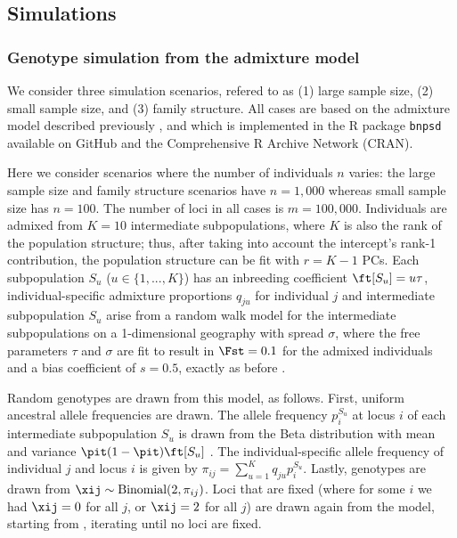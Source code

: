 \documentclass[11pt]{article}
\begin{document}
\subsection{Simulations}

\subsubsection{Genotype simulation from the admixture model}

We consider three simulation scenarios, refered to as (1) large sample size, (2) small sample size, and (3) family structure.
All cases are based on the admixture model described previously \citep{ochoa_fst1, ochoa_fst2}, and which is implemented in the R package \texttt{bnpsd} available on GitHub and the Comprehensive R Archive Network (CRAN).

Here we consider scenarios where the number of individuals $n$ varies:
the large sample size and family structure scenarios have $n = 1,000$ whereas small sample size has $n = 100$.
The number of loci in all cases is $m = 100,000$.
Individuals are admixed from $K = 10$ intermediate subpopulations, where $K$ is also the rank of the population structure; thus, after taking into account the intercept's rank-1 contribution, the population structure can be fit with $r = K-1$ PCs.
Each subpopulation $S_u$ ($u \in \{ 1, ..., K \}$) has an inbreeding coefficient $\ft[S_u] = u \tau$, individual-specific admixture proportions $q_{ju}$ for individual $j$ and intermediate subpopulation $S_u$ arise from a random walk model for the intermediate subpopulations on a 1-dimensional geography with spread $\sigma$, where the free parameters $\tau$ and $\sigma$ are fit to result in $\Fst = 0.1$ for the admixed individuals and a bias coefficient of $s = 0.5$, exactly as before \citep{ochoa_fst2}.

Random genotypes are drawn from this model, as follows.
First, uniform ancestral allele frequencies \pit are drawn.
The allele frequency $p_i^{S_u}$ at locus $i$ of each intermediate subpopulation $S_u$ is drawn from the Beta distribution with mean \pit and variance $\pit(1-\pit) \ft[S_u]$ \citep{balding_method_1995}.
The individual-specific allele frequency of individual $j$ and locus $i$ is given by
$
\pi_{ij} = \sum_{u = 1}^K q_{ju} p_i^{S_u}.
$
Lastly, genotypes are drawn from $\xij \sim \text{Binomial}(2, \pi_{ij})$.
Loci that are fixed (where for some $i$ we had $\xij = 0$ for all $j$, or $\xij = 2$ for all $j$) are drawn again from the model, starting from \pit, iterating until no loci are fixed.
\end{document}
